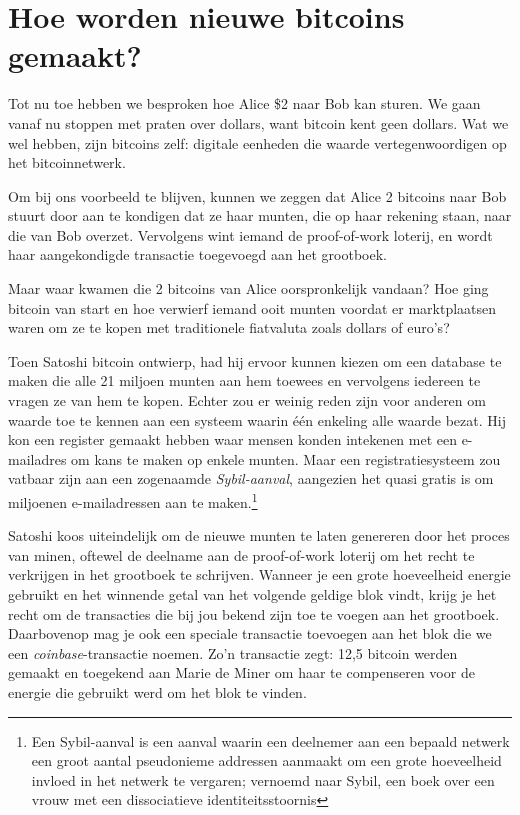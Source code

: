 \documentclass[smalldemyvopaper,11pt,twoside,onecolumn,openright,extrafontsizes]{memoir}
\begin{document}
\section{Hoe worden nieuwe bitcoins gemaakt?}

Tot nu toe hebben we besproken hoe Alice \$2 naar Bob kan sturen. We gaan vanaf nu stoppen met praten over dollars, want bitcoin kent geen dollars. Wat we wel hebben, zijn bitcoins zelf: digitale eenheden die waarde vertegenwoordigen op het bitcoinnetwerk.

Om bij ons voorbeeld te blijven, kunnen we zeggen dat Alice 2 bitcoins naar Bob stuurt door aan te kondigen dat ze haar munten, die op haar \textquotedbl{}rekening\textquotedbl{} staan, naar die van Bob overzet. Vervolgens wint iemand de proof-of-work loterij, en wordt haar aangekondigde transactie toegevoegd aan het grootboek.

Maar waar kwamen die 2 bitcoins van Alice oorspronkelijk vandaan? Hoe ging bitcoin van start en hoe verwierf iemand ooit munten voordat er marktplaatsen waren om ze te kopen met traditionele fiatvaluta zoals dollars of euro’s?

Toen Satoshi bitcoin ontwierp, had hij ervoor kunnen kiezen om een database te maken die alle 21 miljoen munten aan hem toewees en vervolgens iedereen te vragen ze van hem te kopen. Echter zou er weinig reden zijn voor anderen om waarde toe te kennen aan een systeem waarin één enkeling alle waarde bezat. Hij kon een register gemaakt hebben waar mensen konden intekenen met een e-mailadres om kans te maken op enkele munten. Maar een registratiesysteem zou vatbaar zijn aan een zogenaamde \textit{Sybil-aanval}, aangezien het quasi gratis is om miljoenen e-mailadressen aan te maken.\footnote{Een Sybil-aanval is een aanval waarin een deelnemer aan een bepaald netwerk een groot aantal pseudonieme addressen aanmaakt om een grote hoeveelheid invloed in het netwerk te vergaren; vernoemd naar Sybil, een boek over een vrouw met een dissociatieve identiteitsstoornis}

Satoshi koos uiteindelijk om de nieuwe munten te laten genereren door het proces van minen, oftewel de deelname aan de proof-of-work loterij om het recht te verkrijgen in het grootboek te schrijven. Wanneer je een grote hoeveelheid energie gebruikt en het winnende getal van het volgende geldige blok vindt, krijg je het recht om de transacties die bij jou bekend zijn toe te voegen aan het grootboek. Daarbovenop mag je ook een speciale transactie toevoegen aan het blok die we een \textit{coinbase}-transactie noemen. Zo’n transactie zegt: \textquotedbl{}12,5 bitcoin werden gemaakt en toegekend aan Marie de Miner om haar te compenseren voor de energie die gebruikt werd om het blok te vinden.\textquotedbl{}
\end{document}
